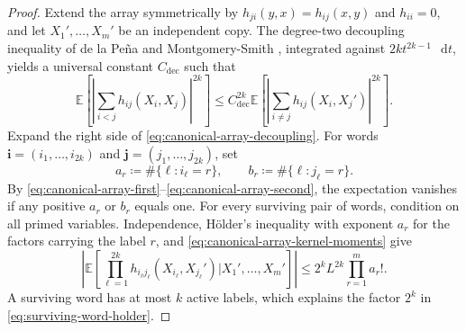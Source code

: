 \documentclass[11pt,reqno]{amsart}
\numberwithin{equation}{section}
\theoremstyle{plain}
\theoremstyle{definition}
\newcommand{\dd}{\mathop{}\!\mathrm d}
\newcommand{\E}{\mathbb E}
\begin{document}
\begin{proof}
Extend the array symmetrically by $h_{ji}(y,x)=h_{ij}(x,y)$ and $h_{ii}=0$, and let $X_1',\ldots,X_m'$ be an independent copy.  The degree-two decoupling inequality of de la Pe\~na and Montgomery-Smith \cite[Theorem~1]{delaPenaMontgomerySmith1995}, integrated against $2kt^{2k-1}\,\dd t$, yields a universal constant $C_{\mathrm{dec}}$ such that
\begin{equation}
 \E\left[\left|\sum_{i<j}h_{ij}(X_i,X_j)\right|^{2k}\right]
 \leq C_{\mathrm{dec}}^{2k}
 \E\left[\left|\sum_{i\neq j}h_{ij}(X_i,X_j')\right|^{2k}\right].
 \label{eq:canonical-array-decoupling}
\end{equation}
Expand the right side of \eqref{eq:canonical-array-decoupling}.  For words $\mathbf i=(i_1,\ldots,i_{2k})$ and $\mathbf j=(j_1,\ldots,j_{2k})$, set
\begin{equation}
 a_r\coloneqq\#\{\ell:i_\ell=r\},
 \qquad
 b_r\coloneqq\#\{\ell:j_\ell=r\}.
 \label{eq:word-multiplicities}
\end{equation}
By \eqref{eq:canonical-array-first}--\eqref{eq:canonical-array-second}, the expectation vanishes if any positive $a_r$ or $b_r$ equals one.  For every surviving pair of words, condition on all primed variables.  Independence, H\"older's inequality with exponent $a_r$ for the factors carrying the label $r$, and \eqref{eq:canonical-array-kernel-moments} give
\begin{equation}
 \left|\E\left[\prod_{\ell=1}^{2k}
 h_{i_\ell j_\ell}(X_{i_\ell},X_{j_\ell}')
 \mathrel{\Big|}X_1',\ldots,X_m'\right]\right|
 \leq2^kL^{2k}\prod_{r=1}^m a_r!.
 \label{eq:surviving-word-holder}
\end{equation}
A surviving word has at most $k$ active labels, which explains the factor $2^k$ in \eqref{eq:surviving-word-holder}.


\end{proof}
\end{document}
